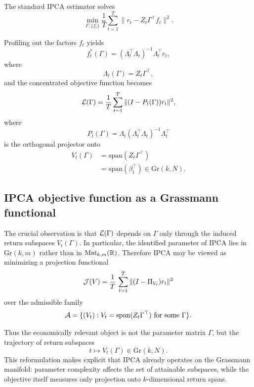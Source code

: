 \documentclass[twoside,11pt,letter]{article}
\begin{document}
The standard IPCA estimator solves
\begin{equation*}
\min_{\Gamma,\{f_t\}}
\frac{1}{T}\sum_{t=1}^T
\|r_t - Z_t\Gamma^\top f_t\|^2.
\end{equation*}

Profiling out the factors $f_t$ yields
\begin{equation}
f_t^*(\Gamma)=(\Lambda_t^\top \Lambda_t)^{-1}\Lambda_t^\top r_t,
\end{equation}
where
\begin{equation}
\Lambda_t(\Gamma)=Z_t\Gamma^\top,
\end{equation}
and the concentrated objective function becomes
\begin{equation}
\mathcal{L}(\Gamma)=\frac{1}{T}\sum_{t=1}^T\|(I-P_t(\Gamma))r_t\|^2,
\end{equation}
where
\begin{equation*}
P_t(\Gamma)=\Lambda_t(\Lambda_t^\top\Lambda_t)^{-1}\Lambda_t^\top
\end{equation*}
is the orthogonal projector onto
\begin{equation*}
\begin{split}
V_t(\Gamma)&=\mathrm{span}(Z_t\Gamma^\top)\\
&=\mathrm{span}(\beta_t^\top)\in\mathrm{Gr}(k,N).
\end{split}
\end{equation*}

\subsection{IPCA objective function as a Grassmann functional}

The crucial observation is that $\mathcal{L}(\Gamma)$ depends on $\Gamma$ only through the induced return subspaces $V_t(\Gamma)$. In particular, the identified parameter of IPCA lies in $\mathrm{Gr}(k,m)$ rather than in $\mathrm{Mat}_{k,m}(\mathbb{R})$. Therefore IPCA may be viewed as minimizing a projection functional
\begin{equation}
{\mathcal{J}}(V)=\frac{1}{T}\,\sum_{t=1}^T \|(I-\Pi_{V_t})r_t\|^2
\end{equation}
over the admissible family
\begin{equation*}
\mathcal{A}=\{(V_t): V_t=\mathrm{span}(Z_t\Gamma^\top)\text{ for some }\Gamma\}.
\end{equation*}

Thus the economically relevant object is not the parameter matrix $\Gamma$, but the trajectory of return subspaces
\begin{equation*}
t\longmapsto V_t(\Gamma)\in\mathrm{Gr}(k,N).
\end{equation*}
This reformulation makes explicit that IPCA already operates on the Grassmann manifold: parameter complexity affects the set of attainable subspaces, while the objective itself measures only projection onto $k$-dimensional return spans.
\end{document}
